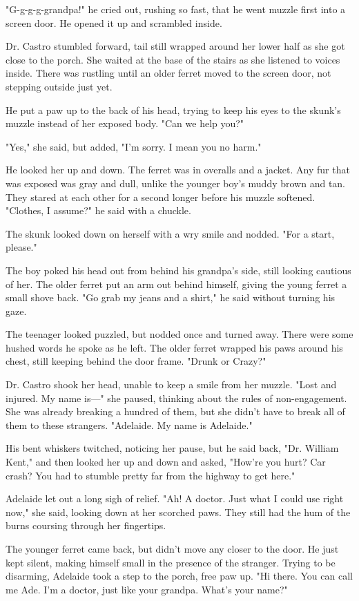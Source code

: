 "G-g-g-g-grandpa!" he cried out, rushing so fast, that he went muzzle first into a screen door. He opened it up and scrambled inside.

Dr. Castro stumbled forward, tail still wrapped around her lower half as she got close to the porch. She waited at the base of the stairs as she listened to voices inside. There was rustling until an older ferret moved to the screen door, not stepping outside just yet.

He put a paw up to the back of his head, trying to keep his eyes to the skunk's muzzle instead of her exposed body. "Can we help you?"

"Yes," she said, but added, "I'm sorry. I mean you no harm."

He looked her up and down. The ferret was in overalls and a jacket. Any fur that was exposed was gray and dull, unlike the younger boy's muddy brown and tan. They stared at each other for a second longer before his muzzle softened. "Clothes, I assume?" he said with a chuckle.

The skunk looked down on herself with a wry smile and nodded. "For a start, please."

The boy poked his head out from behind his grandpa's side, still looking cautious of her. The older ferret put an arm out behind himself, giving the young ferret a small shove back. "Go grab my jeans and a shirt," he said without turning his gaze.

The teenager looked puzzled, but nodded once and turned away. There were some hushed words he spoke as he left. The older ferret wrapped his paws around his chest, still keeping behind the door frame. "Drunk or Crazy?"

Dr. Castro shook her head, unable to keep a smile from her muzzle. "Lost and injured. My name is---" she paused, thinking about the rules of non-engagement. She was already breaking a hundred of them, but she didn't have to break all of them to these strangers. "Adelaide. My name is Adelaide."

His bent whiskers twitched, noticing her pause, but he said back, "Dr. William Kent," and then looked her up and down and asked, "How're you hurt? Car crash? You had to stumble pretty far from the highway to get here."

Adelaide let out a long sigh of relief. "Ah! A doctor. Just what I could use right now," she said, looking down at her scorched paws. They still had the hum of the burns coursing through her fingertips.

The younger ferret came back, but didn't move any closer to the door. He just kept silent, making himself small in the presence of the stranger. Trying to be disarming, Adelaide took a step to the porch, free paw up. "Hi there. You can call me Ade. I'm a doctor, just like your grandpa. What's your name?"

